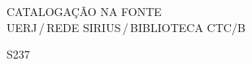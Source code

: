 %
% 


\begin{titlepage}
	\begin{center}
\vfill
\singlespacing
	\vspace*{95mm}
	{CATALOGAÇÃO NA FONTE\\ \vspace{1.5mm}
	UERJ\,/\,REDE SIRIUS\,/\,BIBLIOTECA CTC/B}\\
	\vspace{1.5mm}
	\begin{boxedminipage}{140mm}
	\begin{minipage}{5mm}
		\vspace{-84mm}
		S237
	\end{minipage}
	\hfill
	\raisebox{8.5mm}{
	\begin{minipage}[top]{115mm}
		\vspace*{5mm}


\end{minipage}}
\end{boxedminipage}
\end{center}
\end{titlepage}

